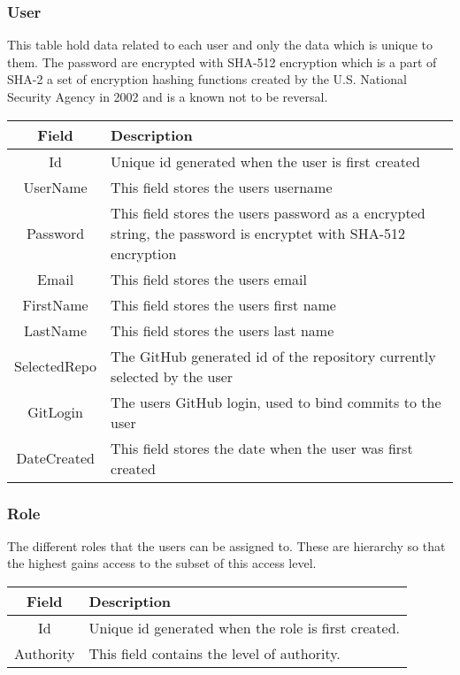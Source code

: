 \subsubsection*{User}
This table hold data related to each user and only the data which is unique to them.
The password are encrypted with SHA-512 encryption which is a part of SHA-2 a set of encryption hashing functions created by the U.S. National Security Agency in 2002 and is a known not to be reversal.\\

\vspace{0.5cm}
\begin{tabularx}{\linewidth}{| c | X |}
    \hline
    \rowcolor[gray]{0.8}
    \textbf{Field} & \textbf{Description} \\
    \hline
    Id & Unique id generated when the user is first created\\ \hline
    UserName & This field stores the users username\\ \hline
   	Password & This field stores the users password as a encrypted string, the password is encryptet with SHA-512 encryption\\ \hline
    Email & This field stores the users email\\ \hline
    FirstName & This field stores the users first name\\ \hline
    LastName & This field stores the users last name\\ \hline
    SelectedRepo & The GitHub generated id of the repository currently selected by the user\\ \hline
    GitLogin & The users GitHub login, used to bind commits to the user\\ \hline
    DateCreated & This field stores the date when the user was first created\\
    \hline
\end{tabularx}
\vspace{0.5cm}

\subsubsection*{Role}
The different roles that the users can be assigned to. These are hierarchy so that the highest gains access to the subset of this access level. \\

\vspace{0.5cm}
\begin{tabularx}{\linewidth}{| c | X |}
    \hline
    \rowcolor[gray]{0.8}
    \textbf{Field} & \textbf{Description} \\
    \hline
    Id & Unique id generated when the role is first created.\\ \hline
    Authority & This field contains the level of authority.\\
    \hline
\end{tabularx}
\vspace{0.5cm}

